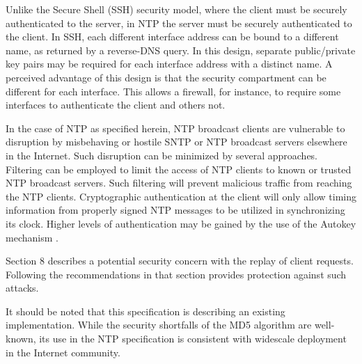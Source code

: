 Unlike the Secure Shell (SSH) security model, where the client must
be securely authenticated to the server, in NTP the server must be
securely authenticated to the client.  In SSH, each different
interface address can be bound to a different name, as returned by a
reverse-DNS query.  In this design, separate public/private key pairs
may be required for each interface address with a distinct name.  A
perceived advantage of this design is that the security compartment
can be different for each interface.  This allows a firewall, for
instance, to require some interfaces to authenticate the client and
others not.

In the case of NTP as specified herein, NTP broadcast clients are
vulnerable to disruption by misbehaving or hostile SNTP or NTP
broadcast servers elsewhere in the Internet.  Such disruption can be
minimized by several approaches.  Filtering can be employed to limit
the access of NTP clients to known or trusted NTP broadcast servers.
Such filtering will prevent malicious traffic from reaching the NTP
clients.  Cryptographic authentication at the client will only allow
timing information from properly signed NTP messages to be utilized
in synchronizing its clock.  Higher levels of authentication may be
gained by the use of the Autokey mechanism \cite{RFC5906}.

Section 8 describes a potential security concern with the replay of
client requests.  Following the recommendations in that section
provides protection against such attacks.

It should be noted that this specification is describing an existing
implementation.  While the security shortfalls of the MD5 algorithm
are well-known, its use in the NTP specification is consistent with
widescale deployment in the Internet community.
